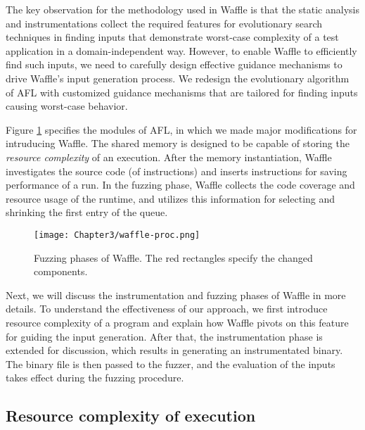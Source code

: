 
The key observation for the methodology used in Waffle is that the static analysis and instrumentations collect the required features for evolutionary search techniques in finding inputs that demonstrate worst-case complexity of a test application in a domain-independent way. However, to enable Waffle to efficiently find such inputs, we need to carefully design effective guidance mechanisms to drive Waffle's input generation process. We redesign the evolutionary algorithm of AFL with customized guidance mechanisms that are tailored for finding inputs causing worst-case behavior.

Figure \ref{fig:waffle-phases} specifies the modules of AFL, in which we made major modifications for intruducing Waffle. The shared memory is designed to be capable of storing the \textit{resource complexity} of an execution. After the memory instantiation, Waffle investigates the source code (of instructions) and inserts instructions for saving performance of a run. In the fuzzing phase, Waffle collects the code coverage and resource usage of the runtime, and utilizes this information for selecting and shrinking the first entry of the queue.

\begin{figure}[!b]
  \texttt{[image: Chapter3/waffle-proc.png]}
  \centering
  \caption{Fuzzing phases of Waffle. The red rectangles specify the changed components.}
  \label{fig:waffle-phases}
\end{figure}



Next, we will discuss the instrumentation and fuzzing phases of Waffle in more details. To understand the effectiveness of our approach, we first introduce resource complexity of a program and explain how Waffle pivots on this feature for guiding the input generation. After that, the instrumentation phase is extended for discussion, which results in generating an instrumentated binary. The binary file is then passed to the fuzzer, and the evaluation of the inputs takes effect during the fuzzing procedure.

\subsection{Resource complexity of execution}

